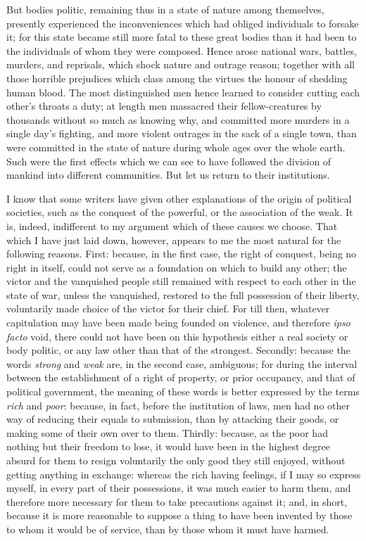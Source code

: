 \documentclass[12pt]{report}
\begin{document}
But bodies politic, remaining thus in a state of nature among themselves, presently experienced the inconveniences which had obliged individuals to forsake it; for this state became still more fatal to these great bodies than it had been to the individuals of whom they were composed. Hence arose national wars, battles, murders, and reprisals, which shock nature and outrage reason; together with all those horrible prejudices which class among the virtues the honour of shedding human blood. The most distinguished men hence learned to consider cutting each other's throats a duty; at length men massacred their fellow-creatures by thousands without so much as knowing why, and committed more murders in a single day's fighting, and more violent outrages in the sack of a single town, than were committed in the state of nature during whole ages over the whole earth. Such were the first effects which we can see to have followed the division of mankind into different communities. But let us return to their institutions.

I know that some writers have given other explanations of the origin of political societies, such as the conquest of the powerful, or the association of the weak. It is, indeed, indifferent to my argument which of these causes we choose. That which I have just laid down, however, appears to me the most natural for the following reasons. First: because, in the first case, the right of conquest, being no right in itself, could not serve as a foundation on which to build any other; the victor and the vanquished people still remained with respect to each other in the state of war, unless the vanquished, restored to the full possession of their liberty, voluntarily made choice of the victor for their chief. For till then, whatever capitulation may have been made being founded on violence, and therefore \textit{ipso facto} void, there could not have been on this hypothesis either a real society or body politic, or any law other than that of the strongest. Secondly: because the words \emph{strong} and \emph{weak} are, in the second case, ambiguous; for during the interval between the establishment of a right of property, or prior occupancy, and that of political government, the meaning of these words is better expressed by the terms \emph{rich} and \emph{poor}: because, in fact, before the institution of laws, men had no other way of reducing their equals to submission, than by attacking their goods, or making some of their own over to them. Thirdly: because, as the poor had nothing but their freedom to lose, it would have been in the highest degree absurd for them to resign voluntarily the only good they still enjoyed, without getting anything in exchange: whereas the rich having feelings, if I may so express myself, in every part of their possessions, it was much easier to harm them, and therefore more necessary for them to take precautions against it; and, in short, because it is more reasonable to suppose a thing to have been invented by those to whom it would be of service, than by those whom it must have harmed.
\end{document}

